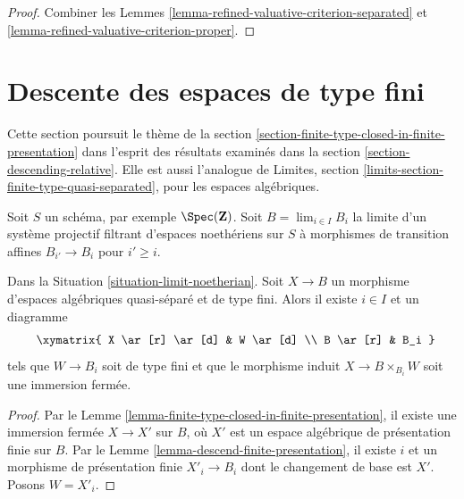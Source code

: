 \begin{proof}
Combiner les Lemmes \ref{lemma-refined-valuative-criterion-separated} et
\ref{lemma-refined-valuative-criterion-proper}.
\end{proof}







\section{Descente des espaces de type fini}
\label{section-finite-type-quasi-separated}

\noindent
Cette section poursuit le th\`eme de la
section \ref{section-finite-type-closed-in-finite-presentation}
dans l'esprit des r\'esultats examin\'es dans la
section \ref{section-descending-relative}.
Elle est aussi l'analogue de
Limites, section \ref{limits-section-finite-type-quasi-separated},
pour les espaces alg\'ebriques.

\begin{situation}
\label{situation-limit-noetherian}
Soit $S$ un sch\'ema, par exemple $\Spec(\mathbf{Z})$.
Soit $B = \lim_{i \in I} B_i$ la limite
d'un syst\`eme projectif filtrant d'espaces noeth\'eriens sur $S$
\`a morphismes de transition affines
$B_{i'} \to B_i$ pour $i' \geq i$.
\end{situation}

\begin{lemma}
\label{lemma-good-diagram}
Dans la Situation \ref{situation-limit-noetherian}.
Soit $X \to B$ un morphisme d'espaces alg\'ebriques
quasi-s\'epar\'e et de type fini.
Alors il existe $i \in I$ et un diagramme
\begin{equation}
\label{equation-good-diagram}
\vcenter{
\xymatrix{
X \ar[r] \ar[d] & W \ar[d] \\
B \ar[r] & B_i
}
}
\end{equation}
tels que $W \to B_i$ soit de type fini et que
le morphisme induit $X \to B \times_{B_i} W$ soit une immersion
ferm\'ee.
\end{lemma}

\begin{proof}
Par le Lemme \ref{lemma-finite-type-closed-in-finite-presentation},
il existe une immersion ferm\'ee $X \to X'$
sur $B$, o\`u $X'$ est un espace alg\'ebrique de pr\'esentation finie sur $B$.
Par le Lemme \ref{lemma-descend-finite-presentation},
il existe $i$ et un morphisme de pr\'esentation finie
$X'_i \to B_i$ dont le changement de base est $X'$. Posons $W = X'_i$.
\end{proof}


